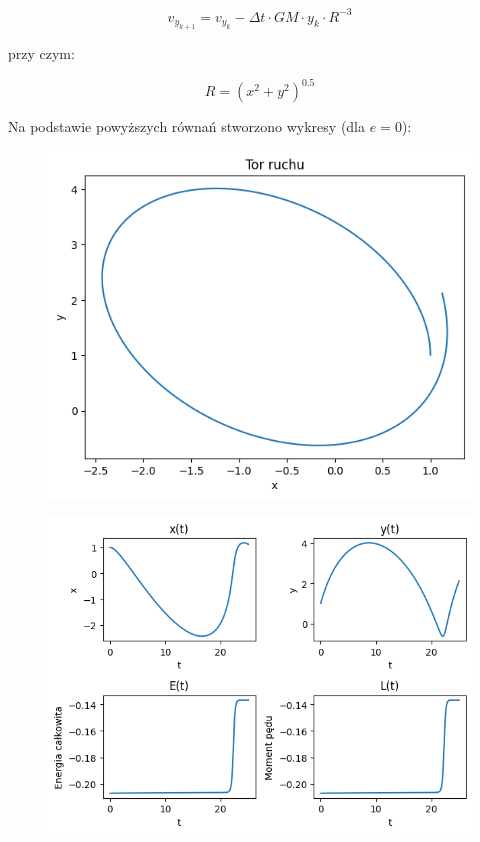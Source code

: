 \documentclass{article}
\begin{document}
	\begin{equation}
		v_{y_{k+1}} = v_{y_k} - \Delta t \cdot GM \cdot y_k \cdot R^{-3}
	\end{equation}

	przy czym:

	\begin{equation}
		R = (x^2 + y^2) ^ {0.5}
	\end{equation}

	\newpage

	Na podstawie powyższych równań stworzono wykresy (dla $e = 0$):

	\begin{figure}[h]
		\centering
		\includegraphics[scale = 0.5]{wykres1.png}
	\end{figure}

	\begin{figure}[h]
		\centering
		\includegraphics[scale = 0.70]{wykres2.png}
	\end{figure}
\end{document}
